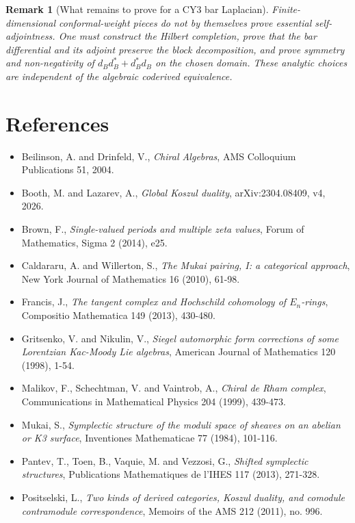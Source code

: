 \documentclass[11pt]{amsart}
\newtheorem{remark}[theorem]{Remark}
\begin{document}
\begin{remark}[What remains to prove for a CY3 bar Laplacian]
Finite-dimensional conformal-weight pieces do not by themselves prove
essential self-adjointness.  One must construct the Hilbert completion,
prove that the bar differential and its adjoint preserve the block
decomposition, and prove symmetry and non-negativity of
$d_Bd_B^*+d_B^*d_B$ on the chosen domain.  These analytic choices are
independent of the algebraic coderived equivalence.
\end{remark}

\section*{References}

\begin{itemize}
\item Beilinson, A. and Drinfeld, V.,
\emph{Chiral Algebras}, AMS Colloquium Publications 51, 2004.
\item Booth, M. and Lazarev, A.,
\emph{Global Koszul duality}, arXiv:2304.08409, v4, 2026.
\item Brown, F.,
\emph{Single-valued periods and multiple zeta values},
Forum of Mathematics, Sigma 2 (2014), e25.
\item Caldararu, A. and Willerton, S.,
\emph{The Mukai pairing, I: a categorical approach},
New York Journal of Mathematics 16 (2010), 61-98.
\item Francis, J.,
\emph{The tangent complex and Hochschild cohomology of $E_n$-rings},
Compositio Mathematica 149 (2013), 430-480.
\item Gritsenko, V. and Nikulin, V.,
\emph{Siegel automorphic form corrections of some Lorentzian Kac-Moody
Lie algebras}, American Journal of Mathematics 120 (1998), 1-54.
\item Malikov, F., Schechtman, V. and Vaintrob, A.,
\emph{Chiral de Rham complex}, Communications in Mathematical Physics
204 (1999), 439-473.
\item Mukai, S.,
\emph{Symplectic structure of the moduli space of sheaves on an
abelian or K3 surface}, Inventiones Mathematicae 77 (1984), 101-116.
\item Pantev, T., Toen, B., Vaquie, M. and Vezzosi, G.,
\emph{Shifted symplectic structures}, Publications Mathematiques de
l'IHES 117 (2013), 271-328.
\item Positselski, L.,
\emph{Two kinds of derived categories, Koszul duality, and comodule
contramodule correspondence}, Memoirs of the AMS 212 (2011), no. 996.
\end{itemize}
\end{document}

